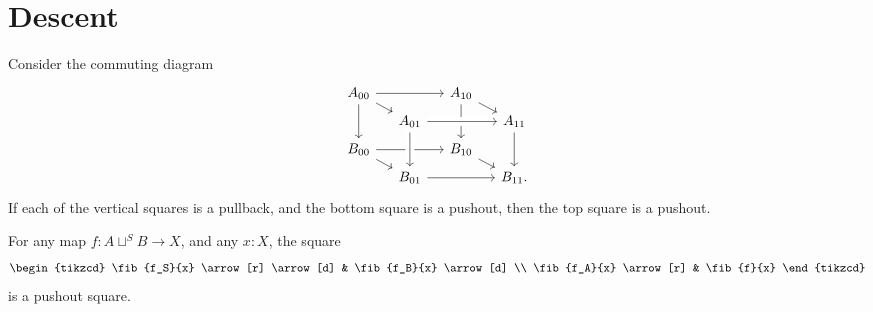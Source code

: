 \chapter{Descent}

\begin{thm}
Consider the commuting diagram
\begin{equation*}
\begin{tikzcd}[column sep=small,row sep=tiny]
A_{00} \arrow[rr] \arrow[dr] \arrow[dd] & & A_{10} \arrow[dd] \arrow[dr] \\
& A_{01} \arrow[rr,crossing over] & & A_{11} \arrow[dd] \\
B_{00} \arrow[rr] \arrow[dr] & & B_{10} \arrow[dr] \\
& B_{01} \arrow[from=uu,crossing over] \arrow[rr] & & B_{11}.
\end{tikzcd}
\end{equation*}
If each of the vertical squares is a pullback, and the bottom square  is a pushout, then the top square is a pushout.
\end{thm}

\begin{cor}
For any map $f:A\sqcup^S B\to X$, and any $x:X$, the square
\begin{equation*}
\begin{tikzcd}
\fib{f_S}{x} \arrow[r] \arrow[d] & \fib{f_B}{x} \arrow[d] \\
\fib{f_A}{x} \arrow[r] & \fib{f}{x}
\end{tikzcd}
\end{equation*}
is a pushout square.
\end{cor}

